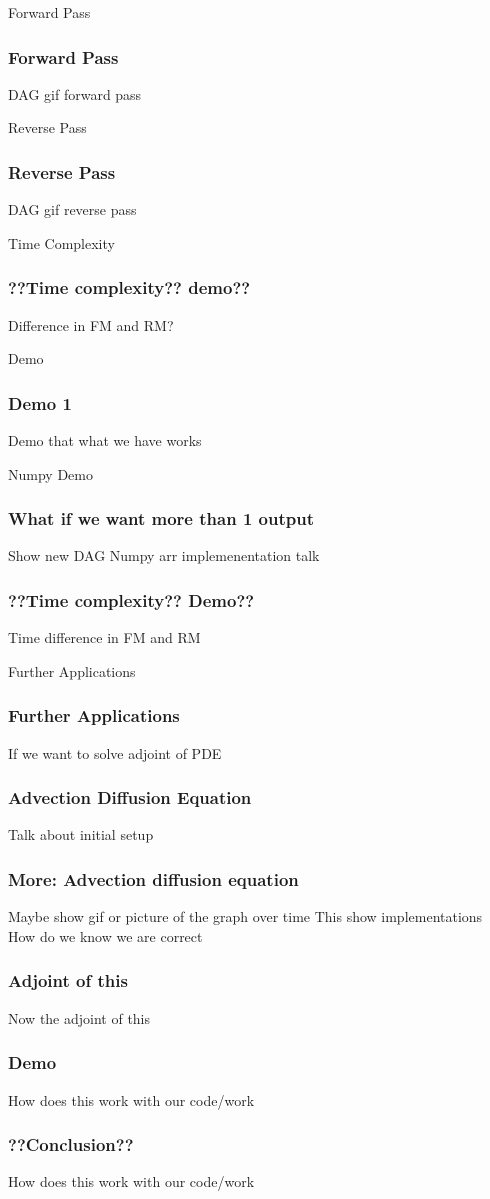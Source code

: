 \documentclass{beamer}
\begin{document}
\begin{frame}{Forward Pass}
\frametitle{Forward Pass}
DAG gif forward pass
\end{frame}

\begin{frame}{Reverse Pass}
\frametitle{Reverse Pass}
DAG gif reverse pass
\end{frame}

\begin{frame}{Time Complexity}
\frametitle{??Time complexity?? demo??}
Difference in FM and RM?
\end{frame}

\begin{frame}{Demo}
\frametitle{Demo 1}
Demo that what we have works
\end{frame}

\begin{frame}{Numpy Demo}
\frametitle{What if we want more than 1 output}
Show new DAG
Numpy arr implemenentation talk
\end{frame}

\begin{frame}
\frametitle{??Time complexity?? Demo??}
Time difference in FM and RM
\end{frame}

\begin{frame}{Further Applications}
\frametitle{Further Applications}
If we want to solve adjoint of PDE
\end{frame}

\begin{frame}
\frametitle{Advection Diffusion Equation}
Talk about initial setup
\end{frame}

\begin{frame}
\frametitle{More: Advection diffusion equation}
Maybe show gif or picture of the graph over time
This show implementations
How do we know we are correct
\end{frame}

\begin{frame}
\frametitle{Adjoint of this}
Now the adjoint of this
\end{frame}

\begin{frame}
\frametitle{Demo}
How does this work with our code/work
\end{frame}

\begin{frame}
\frametitle{??Conclusion??}
How does this work with our code/work
\end{frame}
\end{document}
